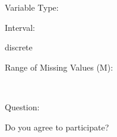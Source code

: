 \documentclass[
]{article}
\begin{document}
\begin{minipage}[t]{0.3\linewidth}

Variable Type:

\end{minipage}%
\begin{minipage}[t]{0.7\linewidth}

\end{minipage}

\begin{minipage}[t]{0.3\linewidth}

Interval:

\end{minipage}%
\begin{minipage}[t]{0.7\linewidth}

discrete

\end{minipage}

\begin{minipage}[t]{0.3\linewidth}

Range of Missing Values (M):

\end{minipage}%
\begin{minipage}[t]{0.7\linewidth}

~

\end{minipage}

\begin{minipage}[t]{0.3\linewidth}

Question:

\end{minipage}%
\begin{minipage}[t]{0.7\linewidth}

Do you agree to participate?

\end{minipage}
\end{document}
